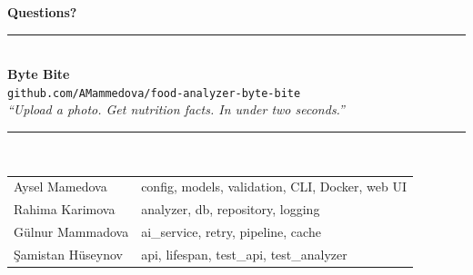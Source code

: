 \documentclass[aspectratio=169,10pt]{beamer}
\newcommand{\teamname}{Byte Bite}
\newcommand{\repolink}{github.com/AMammedova/food-analyzer-byte-bite}
\begin{document}
{
\begin{frame}[plain]
  \begin{center}
    \vspace{0.5cm}
    {\fontsize{36}{40}\bfseries\color{white} Questions?}\\[0.9em]
    \textcolor{white!60!accent}{\rule{0.45\textwidth}{0.5pt}}\\[0.7em]
    {\large\bfseries\color{white} \teamname}\\[0.3em]
    {\normalsize\color{white!80!accent}\texttt{\repolink}}\\[0.6em]
    {\footnotesize\color{white!70!accent}\itshape
      ``Upload a photo. Get nutrition facts. In under two seconds.''}\\[0.7em]
    \textcolor{white!40!accent}{\rule{0.7\textwidth}{0.3pt}}\\[0.5em]
    {\tiny\color{white!55!accent}
      \begin{tabular}{ll}
        Aysel Mamedova   & config, models, validation, CLI, Docker, web UI \\
        Rahima Karimova  & analyzer, db, repository, logging \\
        Gülnur Mammadova & ai\_service, retry, pipeline, cache \\
        Şamistan Hüseynov & api, lifespan, test\_api, test\_analyzer \\
      \end{tabular}
    }
  \end{center}
\end{frame}
}
\end{document}
